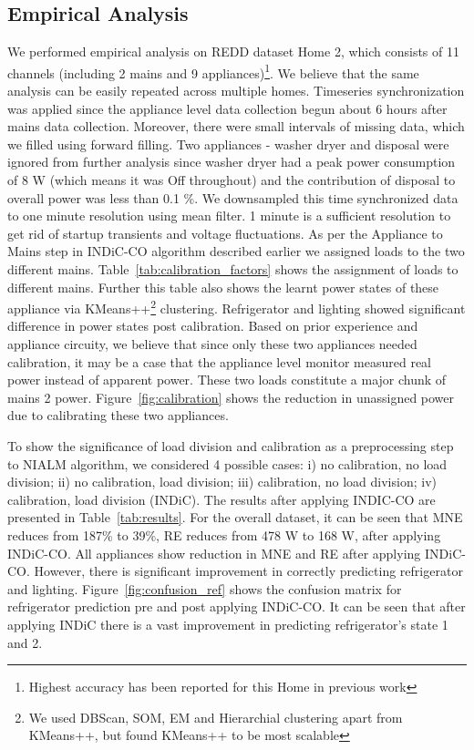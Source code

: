 \documentclass[conference]{IEEEtran}
\newcommand{\figref}[1]{Figure~\ref{#1}}
\newcommand{\tabref}[1]{Table~\ref{#1}}
\begin{document}
\subsection{Empirical Analysis}
\noindent We performed empirical analysis on REDD dataset Home 2, which consists of 11 channels (including 2 mains and 9 appliances)\footnote{Highest accuracy has been reported for this Home in previous work\cite{redd}}. We believe that the same analysis can be easily repeated across multiple homes. Timeseries synchronization was applied since the appliance level data collection begun about 6 hours after mains data collection. Moreover, there were small intervals of missing data, which we filled using forward filling. Two appliances - washer dryer and disposal were ignored from further analysis since washer dryer had a peak power consumption of 8 W (which means it was Off throughout) and the contribution of disposal to overall power was less than 0.1 \%.  We downsampled this time synchronized data to one minute resolution using mean filter. 1 minute is a sufficient resolution to get rid of startup transients and voltage fluctuations. As per the Appliance to Mains step in INDiC-CO algorithm described earlier we assigned loads to the two different mains.  \tabref{tab:calibration_factors} shows the assignment of loads to different mains. Further this table also shows the learnt power states of these appliance via KMeans++\footnote{We used DBScan, SOM, EM and Hierarchial clustering apart from KMeans++, but found KMeans++ to be most scalable} \cite{kmeansplusplus} clustering. Refrigerator and lighting showed significant difference in power states post calibration. Based on prior experience and appliance circuity\cite{ting2005}, we believe that since only these two appliances needed calibration, it may be a case that the appliance level monitor measured real power instead of apparent power. These two loads constitute a major chunk of mains 2 power. \figref{fig:calibration} shows the reduction in unassigned power due to calibrating these two appliances. 

\noindent To show the significance of load division and calibration as a preprocessing step to NIALM algorithm, we considered 4 possible cases:  i) no calibration, no load division; ii) no calibration, load division; iii) calibration, no load division; iv) calibration, load division (INDiC). The results after applying INDIC-CO are presented in \tabref{tab:results}. For the overall dataset, it can be seen that MNE reduces from 187\% to 39\%, RE reduces from 478 W to 168 W, after applying INDiC-CO. All appliances show reduction in MNE and RE after applying INDiC-CO. However, there is significant improvement in correctly predicting refrigerator and lighting. \figref{fig:confusion_ref} shows the confusion matrix for refrigerator prediction pre and post applying INDiC-CO. It can be seen that after applying INDiC there is a vast improvement in predicting refrigerator's state 1 and 2.
%
\end{document}

